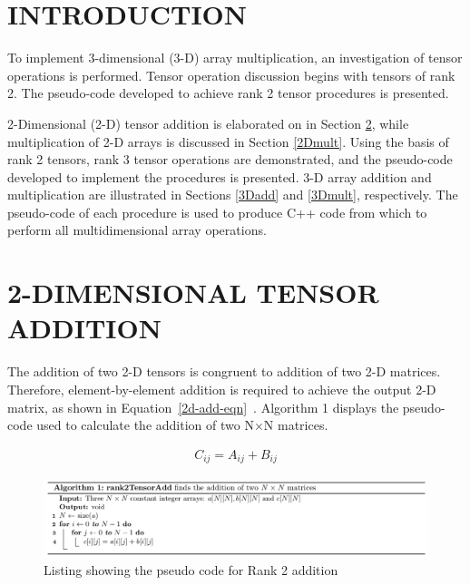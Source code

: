 \maketitle
\thispagestyle{empty}\pagestyle{empty}

%

\section{INTRODUCTION} 

To implement 3-dimensional (3-D) array multiplication, an investigation of tensor operations is performed. Tensor operation discussion begins with tensors of rank 2. The pseudo-code developed to achieve rank 2 tensor procedures is presented. 

2-Dimensional (2-D) tensor addition is elaborated on in Section \ref{2Dadd}, while multiplication of 2-D arrays is discussed in Section \ref{2Dmult}. Using the basis of rank 2 tensors, rank 3 tensor operations are demonstrated, and the pseudo-code developed to implement the procedures is presented. 3-D array addition and multiplication are illustrated in Sections \ref{3Dadd} and \ref{3Dmult}, respectively. The pseudo-code of each procedure is used to produce C++ code from which to perform all multidimensional array operations.  


\section{2-DIMENSIONAL TENSOR ADDITION} \label{2Dadd}

The addition of two 2-D tensors is congruent to addition of two 2-D matrices. Therefore, element-by-element addition is required to achieve the output 2-D matrix, as shown in Equation~\ref{2d-add-eqn}~\cite{matrix_Add}. Algorithm 1 displays the pseudo-code used to calculate the addition of two N$\times$N matrices. \vspace{-5mm}

\begin{align}
C_{ij} = A_{ij} + B_{ij} \label{2d-add-eqn}
\end{align}

\begin{figure}
\includegraphics[width=2\columnwidth]{build/Algo1.png}
\caption{Listing showing the pseudo code for Rank 2 addition}
\end{figure}

